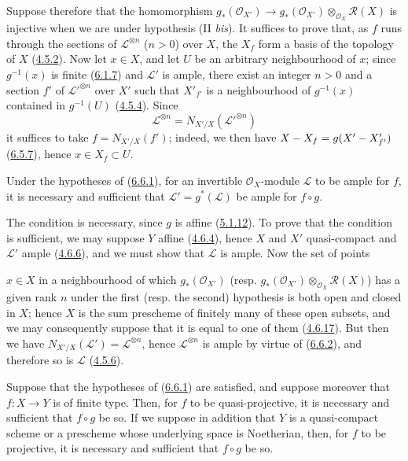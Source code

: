 Suppose therefore that the homomorphism
$g_*(\mathcal{O}_{X'})\to
g_*(\mathcal{O}_{X'})\otimes_{\mathcal{O}_X}\mathcal{R}(X)$ is injective
when we are under hypothesis (II \emph{bis}). It suffices to prove that,
as $f$ runs through the sections of $\mathcal{L}^{\otimes n}$ ($n>0$)
over $X$, the $X_f$ form a basis of the topology of $X$
(\hyperref[II.4.5.2]{4.5.2}). Now let $x\in X$, and let $U$ be an arbitrary
neighbourhood of $x$; since $g^{-1}(x)$ is finite
(\hyperref[II.6.1.7]{6.1.7}) and $\mathcal{L}'$ is ample, there exist an
integer $n>0$ and a section $f'$ of ${\mathcal{L}'}^{\otimes n}$ over
$X'$ such that $X'_{f'}$ is a neighbourhood of $g^{-1}(x)$ contained in
$g^{-1}(U)$ (\hyperref[II.4.5.4]{4.5.4}). Since
\[
\mathcal{L}^{\otimes n}=N_{X'/X}({\mathcal{L}'}^{\otimes n})
\]
it suffices to take $f=N_{X'/X}(f')$; indeed, we then have
$X- X_f=g(X'- X'_{f'})$ (\hyperref[II.6.5.7]{6.5.7}), hence
$x\in X_f\subset U$.

\begin{corollary}[6.6.3]
\label{II.6.6.3}
Under the hypotheses of \textup{(\hyperref[II.6.6.1]{6.6.1})}, for an invertible
$\mathcal{O}_X$-module $\mathcal{L}$ to be ample for $f$, it is necessary
and sufficient that $\mathcal{L}'=g^*(\mathcal{L})$ be ample for $f\circ g$.
\end{corollary}

The condition is necessary, since $g$ is affine
(\hyperref[II.5.1.12]{5.1.12}). To prove that the condition is
sufficient, we may suppose $Y$ affine (\hyperref[II.4.6.4]{4.6.4}), hence
$X$ and $X'$ quasi-compact and $\mathcal{L}'$ ample
(\hyperref[II.4.6.6]{4.6.6}), and we must show that $\mathcal{L}$ is
ample. Now the set of points


$x\in X$ in a neighbourhood of which $g_*(\mathcal{O}_{X'})$ (resp.
$g_*(\mathcal{O}_{X'})\otimes_{\mathcal{O}_X}\mathcal{R}(X)$) has a given
rank $n$ under the first (resp. the second) hypothesis is both open
and closed in $X$; hence $X$ is the sum prescheme of finitely many of these
open subsets, and we may consequently suppose that it is equal to one of them
(\hyperref[II.4.6.17]{4.6.17}). But then we have
$N_{X'/X}(\mathcal{L}')=\mathcal{L}^{\otimes n}$, hence
$\mathcal{L}^{\otimes n}$ is ample by virtue of
(\hyperref[II.6.6.2]{6.6.2}), and therefore so is $\mathcal{L}$
(\hyperref[II.4.5.6]{4.5.6}).

\begin{corollary}[6.6.4]
\label{II.6.6.4}
Suppose that the hypotheses of
\textup{(\hyperref[II.6.6.1]{6.6.1})} are satisfied, and suppose moreover that
$f:X\to Y$ is of finite type. Then, for $f$ to be quasi-projective, it is
necessary and sufficient that $f\circ g$ be so. If we suppose in addition
that $Y$ is a quasi-compact scheme or a prescheme whose underlying space is
Noetherian, then, for $f$ to be projective, it is necessary and sufficient
that $f\circ g$ be so.
\end{corollary}

